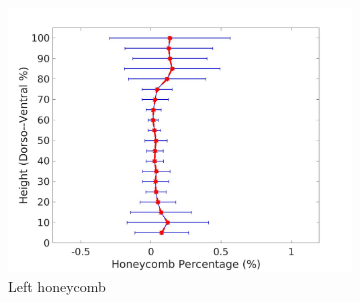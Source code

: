 \begin{figure}[H]
\begin{subfigure}{.42\linewidth}
  \includegraphics[width=\linewidth,trim={{.0\wd0} {.0\wd0} {.0\wd0} {.0\wd0}},clip]{QuantitativeAnalysis/Image/LeftLungHoneycombDiseaseDorsoToVentral.jpg} %
  \caption{Left honeycomb}
  \label{fig:DiseaseDorsoToVentral-e} 
\end{subfigure} 
\begin{subfigure}{.42\linewidth}%

\end{subfigure}
\end{figure}
